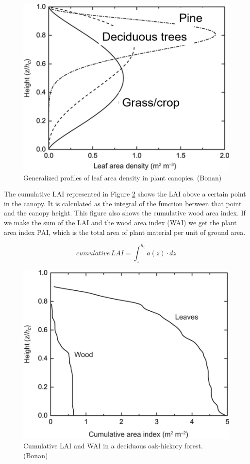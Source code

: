 \documentclass[12pt,oneside]{book}
\begin{document}
\begin{figure}

{\centering \includegraphics[width=0.8\linewidth]{figures/chap3/f31_LAD} 

}

\caption{Generalized profiles of leaf area density in plant canopies. (Bonan)}\label{fig:f31}
\end{figure}

The cumulative LAI represented in Figure \ref{fig:f32} shows the LAI
above a certain point in the canopy. It is calculated as the integral of
the function between that point and the canopy height. This figure also
shows the cumulative wood area index. If we make the sum of the LAI and
the wood area index (WAI) we get the plant area index PAI, which is the
total area of plant material per unit of ground area.

\[
cumulative \, LAI = \int_z^{h_c}a(z) \cdot dz
\]

\begin{figure}

{\centering \includegraphics[width=0.8\linewidth]{figures/chap3/f32_cLAI} 

}

\caption{Cumulative LAI and WAI in a deciduous oak-hickory forest. (Bonan)}\label{fig:f32}
\end{figure}
\end{document}
